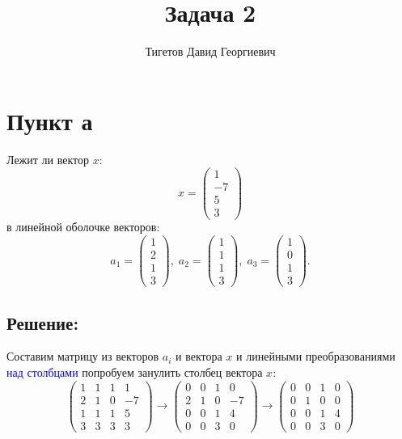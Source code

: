 \documentclass[12pt]{article}
\begin{document}
    \title{Задача 2}
    \author{Тигетов Давид Георгиевич}
    \date{}
    \maketitle

    \section*{Пункт а}
    Лежит ли вектор $x$:
    \[
        x =
        \begin{pmatrix}
            1 \\ -7 \\ 5 \\ 3
        \end{pmatrix}
    \]
    в линейной оболочке векторов:
    \[
        a_1 =
        \begin{pmatrix}
            1 \\ 2 \\ 1 \\ 3
        \end{pmatrix}, \;
        a_2 =
        \begin{pmatrix}
            1 \\ 1 \\ 1 \\ 3
        \end{pmatrix}, \;
        a_3 =
        \begin{pmatrix}
            1 \\ 0 \\ 1 \\ 3
        \end{pmatrix}.
    \]

    \subsection*{Решение:}
    Составим матрицу из векторов $a_i$ и вектора $x$ и линейными преобразованиями \textcolor{blue}{над столбцами} попробуем занулить столбец вектора $x$:
    \[
        \begin{pmatrix}
            1 & 1 & 1 & 1  \\
            2 & 1 & 0 & -7 \\
            1 & 1 & 1 & 5  \\
            3 & 3 & 3 & 3
        \end{pmatrix}
        \rightarrow
        \begin{pmatrix}
            0 & 0 & 1 & 0  \\
            2 & 1 & 0 & -7 \\
            0 & 0 & 1 & 4  \\
            0 & 0 & 3 & 0
        \end{pmatrix}
        \rightarrow
        \begin{pmatrix}
            0 & 0 & 1 & 0 \\
            0 & 1 & 0 & 0 \\
            0 & 0 & 1 & 4 \\
            0 & 0 & 3 & 0
        \end{pmatrix}
    \]
\end{document}
